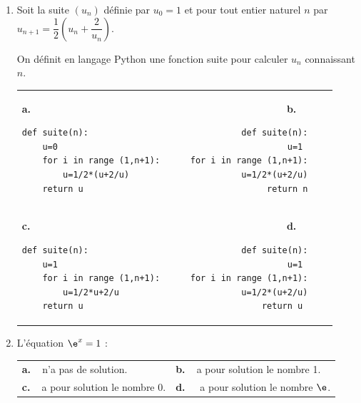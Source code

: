\begin{enumerate}
\item Soit la suite $\left(u_n\right)$ définie par $u_0=1$ et pour tout entier naturel $n$ par $u_{n+1}=\dfrac{1}{2}\left(u_n + \dfrac{2}{u_n}\right)$.

On définit en langage Python une fonction \og suite \fg{} pour calculer $u_n$ connaissant $n$.

\begin{tabular}{*{2}{lr}}
\textbf{a.~~} 
\begin{minipage}[]{0.4\linewidth}
\begin{lstlisting}[style=python]
 def suite(n):
	u=0 
	for i in range (1,n+1):
		u=1/2*(u+2/u) 
	return u
 \end{lstlisting}
\end{minipage} 
 &
\textbf{b.~~}
\begin{minipage}[]{0.4\linewidth}
\begin{lstlisting}[style=python]
 def suite(n):
	u=1 
	for i in range (1,n+1):
		u=1/2*(u+2/u)
	return n
\end{lstlisting}
\end{minipage}\\

\textbf{c.~~}
\begin{minipage}[]{0.4\linewidth}
\begin{lstlisting}[style=python]
 def suite(n):
	u=1
	for i in range (1,n+1):
		u=1/2*u+2/u 
	return u
\end{lstlisting}
\end{minipage}&
\textbf{d.~~}
\begin{minipage}[]{0.4\linewidth}
\begin{lstlisting}[style=python]
 def suite(n):
	u=1 
	for i in range (1,n+1):
		u=1/2*(u+2/u)
	return u 
\end{lstlisting}
\end{minipage}
\end{tabular}

\item L'équation $\e^x=1$ :

\begin{tabularx}{\linewidth}{*{2}{X}}
\textbf{a.~~}n'a pas de solution.  &\textbf{b.~~}a pour solution le nombre 1. \\\textbf{c.~~}a pour solution le nombre 0.& \textbf{d.~~} a pour solution le nombre $\e$.
\end{tabularx}
\end{enumerate}

\vspace{0,5cm}
